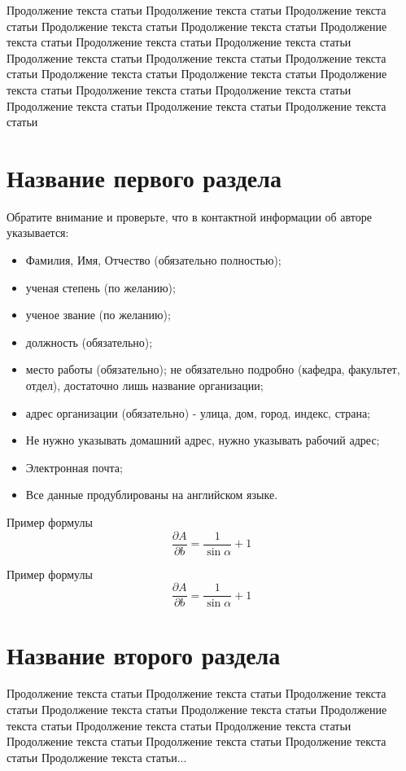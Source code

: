 Продолжение текста статьи Продолжение текста статьи Продолжение текста статьи Продолжение текста статьи Продолжение текста статьи Продолжение текста статьи Продолжение текста статьи Продолжение текста статьи Продолжение текста статьи Продолжение текста статьи Продолжение текста статьи Продолжение текста статьи Продолжение текста статьи Продолжение текста статьи Продолжение текста статьи Продолжение текста статьи Продолжение текста статьи Продолжение текста статьи Продолжение текста статьи 

\section{Название первого раздела}


Обратите внимание и проверьте, что в контактной информации об авторе указывается:
\begin{itemize}
	\item Фамилия, Имя, Отчество (обязательно полностью);
	\item ученая степень (по желанию);
	\item ученое звание (по желанию);
	\item должность (обязательно);
	\item место работы (обязательно);
не обязательно подробно (кафедра, факультет, отдел), достаточно лишь название организации;
	\item адрес организации (обязательно) -  улица, дом, город, индекс, страна;
	\item Не нужно указывать домашний адрес, нужно указывать рабочий адрес;
	\item Электронная почта;
	\item Все данные продублированы на английском языке.
\end{itemize}

Пример формулы 
\begin{equation}
\frac{\partial A}{\partial b}=\frac{1}{\sin \alpha } + 1
\end{equation}

Пример формулы 
\begin{equation}
\frac{\partial A}{\partial b}=\frac{1}{\sin \alpha } + 1
\end{equation}


\section{Название второго раздела}
Продолжение текста статьи Продолжение текста статьи Продолжение текста статьи Продолжение текста статьи Продолжение текста статьи Продолжение текста статьи Продолжение текста статьи Продолжение текста статьи Продолжение текста статьи Продолжение текста статьи Продолжение текста статьи Продолжение текста статьи... 

